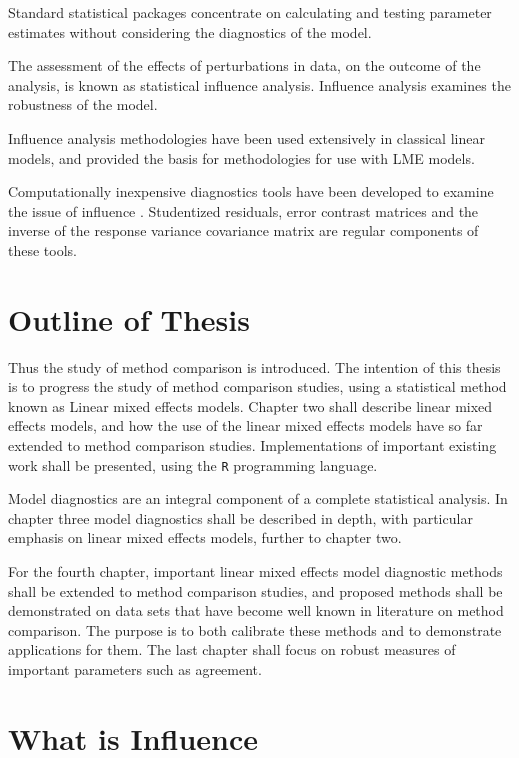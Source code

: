 \documentclass[12pt, a4paper]{report}
\theoremstyle{plain}
\theoremstyle{definition}
\theoremstyle{remark}
\begin{document}
Standard statistical packages concentrate on calculating and testing parameter estimates without considering the diagnostics of the model.

The assessment of the effects of perturbations in data, on the outcome of the analysis, is known as statistical influence analysis. Influence analysis examines the robustness of the model.

Influence analysis methodologies have been used extensively in classical linear models, and provided the basis for methodologies for use with LME models.

Computationally inexpensive diagnostics tools have been developed to examine the issue of influence \citep{tewomir}.
Studentized residuals, error contrast matrices and the inverse of the response variance covariance matrix are regular components of these tools.

\section{Outline of Thesis}
Thus the study of method comparison is introduced. The intention of this thesis is to progress the
study of method comparison studies, using a statistical method known as Linear mixed effects models.
Chapter two shall describe linear mixed effects models, and how the use of the linear mixed
effects models have so far extended to method comparison studies. Implementations of important existing work shall be presented, using the \texttt{R} programming language.

Model diagnostics are an integral component of a complete statistical analysis.
In chapter three model diagnostics shall be described in depth, with particular
emphasis on linear mixed effects models, further to chapter two.

For the fourth chapter, important linear mixed effects model diagnostic methods shall be extended to method comparison studies, and proposed methods shall be demonstrated on data sets that have become well known in literature on method comparison. The purpose is to both calibrate these methods and to demonstrate applications for them.
The last chapter shall focus on robust measures of important parameters such as agreement.

\newpage
\section{What is Influence} %
\end{document}
